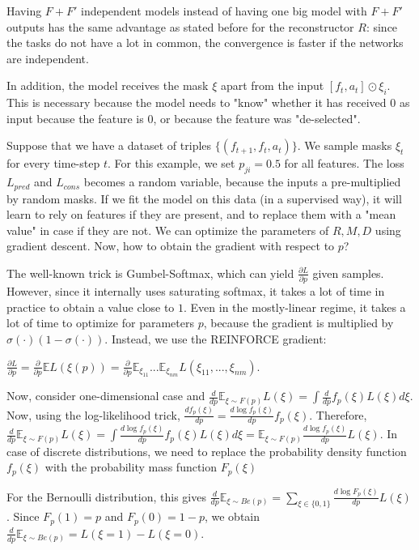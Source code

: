 \documentclass[a4paper,11pt,oneside]{report}
\begin{document}
Having $F+F'$ independent models instead of having one big model with $F+F'$ outputs has the same advantage as stated before for the reconstructor $R$: since the tasks do not have a lot in common, the convergence is faster if the networks are independent.

In addition, the model receives the mask $\xi$ apart from the input $[f_t, a_t]\odot \xi_i$. This is necessary because the model needs to "know" whether it has received $0$ as input because the feature is $0$, or because the feature was "de-selected".

Suppose that we have a dataset of triples $\{(f_{t+1}, f_t, a_t)\}$. We sample masks $\xi_t$ for every time-step $t$. For this example, we set $p_{ji}=0.5$ for all features. The loss $L_{pred}$ and $L_{cons}$ becomes a random variable, because the inputs a pre-multiplied by random masks. If we fit the model on this data (in a supervised way), it will learn to rely on features if they are present, and to replace them with a "mean value" in case if they are not. We can optimize the parameters of $R, M, D$ using gradient descent. Now, how to obtain the gradient with respect to $p$?

The well-known trick is Gumbel-Softmax, which can yield $\frac{\partial L}{\partial p}$ given samples. However, since it internally uses saturating softmax,  it takes a lot of time in practice to obtain a value close to $1$. Even in the mostly-linear regime, it takes a lot of time to optimize for parameters $p$, because the gradient is multiplied by $\sigma(\cdot)(1-\sigma(\cdot))$. Instead, we use the REINFORCE gradient:

$\frac{\partial L}{\partial p}=\frac{\partial}{\partial p}\mathbb{E} L(\xi(p))=\frac{\partial}{\partial p}\mathbb E_{\xi_{11}}...\mathbb E_{\xi_{nm}}L(\xi_{11},...,\xi_{nm})$.

Now, consider one-dimensional case and $\frac{d}{dp}\mathbb E_{\xi\sim F(p)}L(\xi)=\int \frac{d}{dp}f_p(\xi)L(\xi)d\xi$. Now, using the log-likelihood trick, $\frac{df_p(\xi)}{dp}=\frac{d\log f_p(\xi)}{dp}f_p(\xi)$. Therefore, $\frac{d}{dp}\mathbb E_{\xi\sim F(p)}L(\xi)=\int\frac{d\log f_p(\xi)}{dp}f_p(\xi)L(\xi)d\xi=\mathbb E_{\xi\sim F(p)}\frac{d\log f_p(\xi)}{dp}L(\xi)$. In case of discrete distributions, we need to replace the probability density function $f_p(\xi)$ with the probability mass function $F_p(\xi)$

For the Bernoulli distribution, this gives $\frac{d}{dp}\mathbb E_{\xi\sim Be(p)}=\sum_{\xi\in\{0, 1\}}\frac{d\log F_p(\xi)}{dp}L(\xi)$. Since $F_p(1)=p$ and $F_p(0)=1-p$, we obtain $\frac{d}{dp}\mathbb E_{\xi\sim Be(p)}=L(\xi=1)-L(\xi=0)$.
\end{document}
